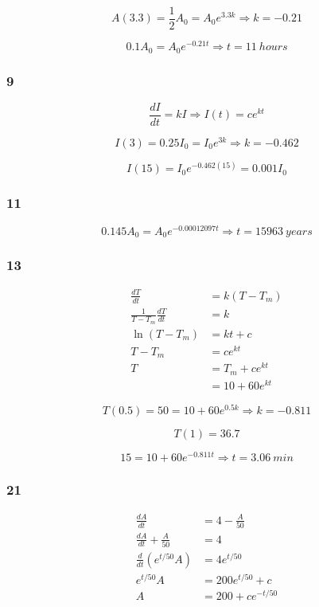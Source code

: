 \documentclass{article}
\begin{document}
\[A(3.3) = \frac{1}{2} A_0 = A_0 e^{3.3 k} \Rightarrow k = -0.21\]

\[0.1 A_0 = A_0 e^{-0.21 t} \Rightarrow t = \qty{11}{hours}\]

\subsubsection{9}

\[\frac{dI}{dt} = k I \Rightarrow I(t) = c e^{k t}\]

\[I(3) = 0.25 I_0 = I_0 e^{3 k} \Rightarrow k = -0.462\]

\[I(15) = I_0 e^{-0.462 (15)} = 0.001 I_0\]

\subsubsection{11}

\[0.145 A_0 = A_0 e^{-0.00012097 t} \Rightarrow t = \qty{15963}{years}\]

\subsubsection{13}

\begin{align*}
  \frac{dT}{dt}                   & = k (T - T_m)     \\
  \frac{1}{T - T_m} \frac{dT}{dt} & = k               \\
  \ln (T - T_m)                   & = k t + c         \\
  T - T_m                         & = c e^{k t}       \\
  T                               & = T_m + c e^{k t} \\
                                  & = 10 + 60 e^{k t}
\end{align*}

\[T(0.5) = 50 = 10 + 60 e^{0.5 k} \Rightarrow k = -0.811\]

\[T(1) = 36.7\]

\[15 = 10 + 60 e^{-0.811 t} \Rightarrow t = \qty{3.06}{min}\]

\subsubsection{21}

\begin{align*}
  \frac{dA}{dt}                & = 4 - \frac{A}{50}    \\
  \frac{dA}{dt} + \frac{A}{50} & = 4                   \\
  \frac{d}{dt} (e^{t / 50} A)  & = 4 e^{t / 50}        \\
  e^{t / 50} A                 & = 200 e^{t / 50} + c  \\
  A                            & = 200 + c e^{-t / 50}
\end{align*}
\end{document}
